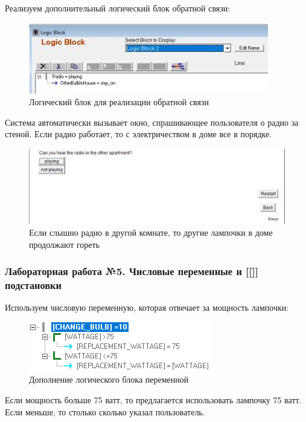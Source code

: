 \documentclass[14pt,a4paper,report]{report}
\begin{document}
Реализуем дополнительный логический блок обратной связи:

\begin{figure}[h!]
	\centering
	\includegraphics[scale = 0.9]{images/4_1.jpg}
	\caption{Логический блок для реализации обратной связи}
\end{figure}

Система автоматически вызывает окно, спрашивающее пользователя о радио за стеной. Если радио работает, то с электричеством в доме все в порядке.


\begin{figure}[h!]
	\centering
	\includegraphics[scale = 0.9]{images/4_2.jpg}
	\caption{Если слышно радио в другой комнате, то другие лампочки в доме продолжают гореть}
\end{figure}


\subsubsection{Лабораторная работа №5. Числовые переменные и [[]] подстановки}

Используем числовую переменную, которая отвечает за мощность лампочки:

\begin{figure}[h!]
	\centering
	\includegraphics[scale = 1.1]{images/5_1.png}
	\caption{Дополнение логического блока переменной}
\end{figure}

Если мощность больше 75 ватт, то предлагается использовать лампочку 75 ватт. Если меньше, то столько сколько указал пользователь.
\end{document}
